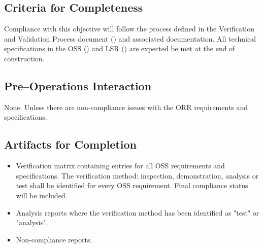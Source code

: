 \subsection{Criteria for Completeness}
Compliance with this objective will follow the process defined in the Verification and Validation Process document () and associated documentation.  
All technical specifications in the OSS () and LSR () are expected be met at the end of construction.

\subsection{Pre--Operations Interaction}
None.  Unless there are non-compliance issues with the ORR requirements and specifications.

\subsection{Artifacts for Completion}

\begin{itemize}
 
	\item Verification matrix containing entries for all OSS requirements and specifications.  The verification method: inspection, demonstration, analysis or test shall be identified for every OSS requirement.  Final compliance status will be included.
	\item Analysis reports where the verification method has been identified as "test" or "analysis".
	\item Non-compliance reports.

\end{itemize}